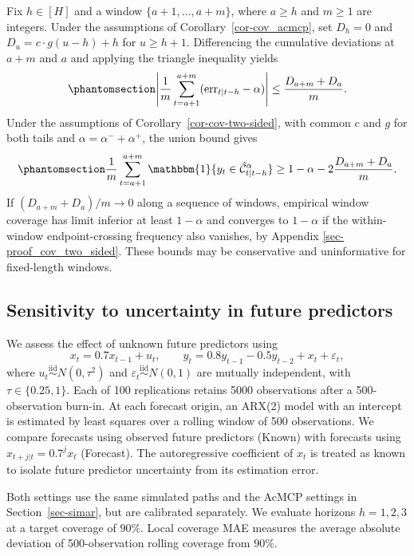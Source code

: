 \documentclass[
  american,
  12pt]{article}
\theoremstyle{plain}
\theoremstyle{plain}
\theoremstyle{remark}
\begin{document}
Fix \(h\in[H]\) and a window \(\{a+1,\ldots,a+m\}\), where \(a\geq h\)
and \(m\geq1\) are integers. Under the assumptions of
Corollary~\ref{cor-cov_acmcp}, set \(D_h=0\) and \(D_u=c\cdot g(u-h)+h\)
for \(u\geq h+1\). Differencing the cumulative deviations at \(a+m\) and
\(a\) and applying the triangle inequality yields
\begin{equation}\phantomsection\label{eq-window-tail}{
\left|\frac1m\sum_{t=a+1}^{a+m}(\mathrm{err}_{t|t-h}-\alpha)\right|
\leq\frac{D_{a+m}+D_a}{m}.
}\end{equation} Under the assumptions of
Corollary~\ref{cor-cov-two-sided}, with common \(c\) and \(g\) for both
tails and \(\alpha=\alpha^{-}+\alpha^{+}\), the union bound gives
\begin{equation}\phantomsection\label{eq-window-coverage}{
\frac1m\sum_{t=a+1}^{a+m}\mathbbm{1}\{y_t\in\hat{\mathcal C}_{t|t-h}^{\alpha}\}
\geq1-\alpha-2\frac{D_{a+m}+D_a}{m}.
}\end{equation} If \((D_{a+m}+D_a)/m\to0\) along a sequence of windows,
empirical window coverage has limit inferior at least \(1-\alpha\) and
converges to \(1-\alpha\) if the within-window endpoint-crossing
frequency also vanishes, by Appendix \ref{sec-proof_cov_two_sided}.
These bounds may be conservative and uninformative for fixed-length
windows.

\subsection{Sensitivity to uncertainty in future
predictors}\label{sec-predictor-uncertainty}

We assess the effect of unknown future predictors using \[
x_t=0.7x_{t-1}+u_t,\qquad
y_t=0.8y_{t-1}-0.5y_{t-2}+x_t+\varepsilon_t,
\] where \(u_t\overset{\mathrm{iid}}{\sim}N(0,\tau^2)\) and
\(\varepsilon_t\overset{\mathrm{iid}}{\sim}N(0,1)\) are mutually
independent, with \(\tau\in\{0.25,1\}\). Each of 100 replications
retains 5000 observations after a 500-observation burn-in. At each
forecast origin, an ARX(2) model with an intercept is estimated by least
squares over a rolling window of 500 observations. We compare forecasts
using observed future predictors (Known) with forecasts using
\(\hat x_{t+j|t}=0.7^j x_t\) (Forecast). The autoregressive coefficient
of \(x_t\) is treated as known to isolate future predictor uncertainty
from its estimation error.

Both settings use the same simulated paths and the AcMCP settings in
Section~\ref{sec-simar}, but are calibrated separately. We evaluate
horizons \(h=1,2,3\) at a target coverage of \(90\%\). Local coverage
MAE measures the average absolute deviation of 500-observation rolling
coverage from \(90\%\).
\end{document}

